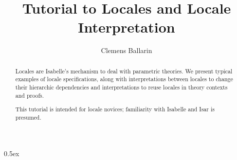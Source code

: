 \documentclass[11pt,a4paper]{article}
\begin{document}
\title{Tutorial to Locales and Locale Interpretation}
\author{Clemens Ballarin}
\date{}

\maketitle

\thispagestyle{myheadings}

\begin{abstract}
  Locales are Isabelle's mechanism to deal with parametric theories.
  We present typical examples of locale specifications,
  along with interpretations between locales to change their
  hierarchic dependencies and interpretations to reuse locales in
  theory contexts and proofs.

  This tutorial is intended for locale novices; familiarity with
  Isabelle and Isar is presumed.
\end{abstract}

\parindent 0pt\parskip 0.5ex



\newpage


\end{document}
